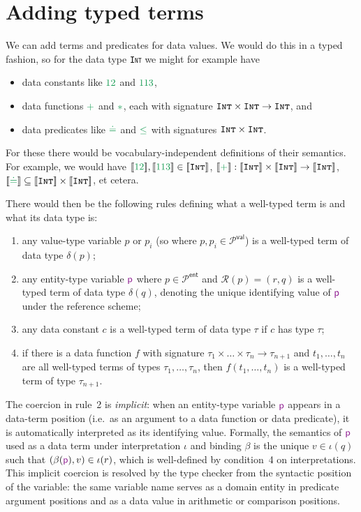 \documentclass[11pt]{amsart}
\theoremstyle{definition}
\theoremstyle{remark}
\newcommand{\Preds}{\mathcal{P}}
\newcommand{\EntPreds}{\Preds^{\textsf{ent}}}
\newcommand{\ValPreds}{\Preds^{\textsf{val}}}
\newcommand{\RefSchemes}{\mathcal{R}}
\newcommand{\sem}[1]{[\![{#1}]\!]}
\newcommand{\var}[1]{\mathsf{\textcolor{Plum}{#1}}}
\newcommand{\tp}[1]{\texttt{\textsc{#1}}}
\newcommand{\dataOp}[1]{\mathbin{\textcolor{ForestGreen}{#1}}}
\newcommand{\dataVal}[1]{\textcolor{ForestGreen}{#1}}
\newcommand{\dataEq}{\mathrel{\textcolor{ForestGreen}{\doteq}}}
\begin{document}
\section{Adding typed terms}
\label{sec:terms}

We can add terms and predicates for data values. We would do this in a typed fashion, so for the data type \tp{Int} we might for example have
\begin{itemize}
  \item data constants like $\dataVal{12}$ and $\dataVal{113}$,
  \item data functions $\dataOp{+}$ and $\dataOp{*}$, each with signature $\tp{Int} \times \tp{Int} \to \tp{Int}$, and
  \item data predicates like $\dataEq$ and $\dataOp{\leq}$ with signatures $\tp{Int} \times \tp{Int}$.
\end{itemize} 
For these there would be vocabulary-independent definitions of their semantics. For example, we would have $\sem{\dataVal{12}}, \sem{\dataVal{113}}  \in \sem{\tp{Int}}$, $\sem{\dataOp{+}} : \sem{\tp{Int}} \times \sem{\tp{Int}} \to \sem{\tp{Int}}$, $\sem{\dataEq} \subseteq \sem{\tp{Int}} \times \sem{\tp{Int}}$, et cetera.

There would then be the following rules defining what a well-typed term is and what its data type is:
\begin{enumerate}
  \item any value-type variable $p$ or $p_i$ (so where $p, p_i \in \ValPreds$) is a well-typed term of data type $\delta(p)$;
  \item any entity-type variable $\var{p}$ where $p \in \EntPreds$ and $\RefSchemes(p) = (r, q)$ is a well-typed term of data type $\delta(q)$, denoting the unique identifying value of $\var{p}$ under the reference scheme;
  \item any data constant $c$ is a well-typed term of data type $\tau$ if $c$ has type $\tau$;
  \item if there is a data function $f$ with signature $\tau_1 \times \ldots \times \tau_n \to \tau_{n+1}$ and $t_1, \ldots, t_n$ are all well-typed terms of types $\tau_1, \ldots, \tau_n$, 
    then $f(t_1, \ldots, t_n)$ is a well-typed term of type $\tau_{n+1}$.
\end{enumerate}
The coercion in rule~2 is \emph{implicit}: when an entity-type variable $\var{p}$ appears in a data-term position (i.e.\ as an argument to a data function or data predicate), it is automatically interpreted as its identifying value. Formally, the semantics of $\var{p}$ used as a data term under interpretation $\iota$ and binding $\beta$ is the unique $v \in \iota(q)$ such that $(\beta(\var{p}), v) \in \iota(r)$, which is well-defined by condition~4 on interpretations. This implicit coercion is resolved by the type checker from the syntactic position of the variable: the same variable name serves as a domain entity in predicate argument positions and as a data value in arithmetic or comparison positions.
\end{document}
